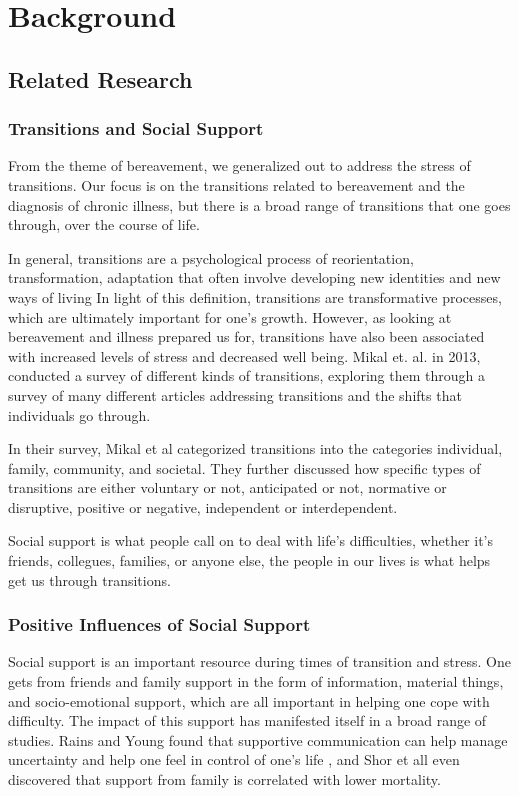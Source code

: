 \chapter{Background}
\section{Related Research}
  \subsection{Transitions and Social Support}
    From the theme of bereavement, we generalized out to address the stress of transitions.
    Our focus is on the transitions related to bereavement and the diagnosis of chronic illness,
    but there is a broad range of transitions that one goes through,
    over the course of life.

    In general, transitions are a psychological process of reorientation, transformation, adaptation
    that often involve developing new identities and new ways of living
    \cite{kralik_06}
    In light of this definition, transitions are transformative processes,
    which are ultimately important for one's growth.
    However, as looking at bereavement and illness prepared us for,
    transitions have also been associated with increased levels of stress and decreased well being.
    \cite{mikal_13}
    Mikal et. al. in 2013, conducted a survey of different kinds of transitions,
    exploring them through a survey of many different articles addressing transitions and
    the shifts that individuals go through.

    In their survey, Mikal et al categorized transitions into the categories
    individual, family, community, and societal.
    They further discussed how specific types of transitions are either voluntary or not, anticipated or not,
    normative or disruptive, positive or negative, independent or interdependent.
    
    Social support is what people call on to deal with life's difficulties,
    whether it's friends, collegues, families, or anyone else, the people in our lives
    is what helps get us through transitions.

  \subsection{Positive Influences of Social Support}
    Social support is an important resource during times of transition and stress.
    One gets from friends and family support in the form of
    information, material things, and socio-emotional support,
    which are all important in helping one cope with difficulty.
    The impact of this support has manifested itself in a broad range of studies.
    Rains and Young found that supportive communication can help manage uncertainty and
    help one feel in control of one's life \cite{rains_09},
    and Shor et all even discovered that support from
    family is correlated with lower mortality. \cite{shor_13}

